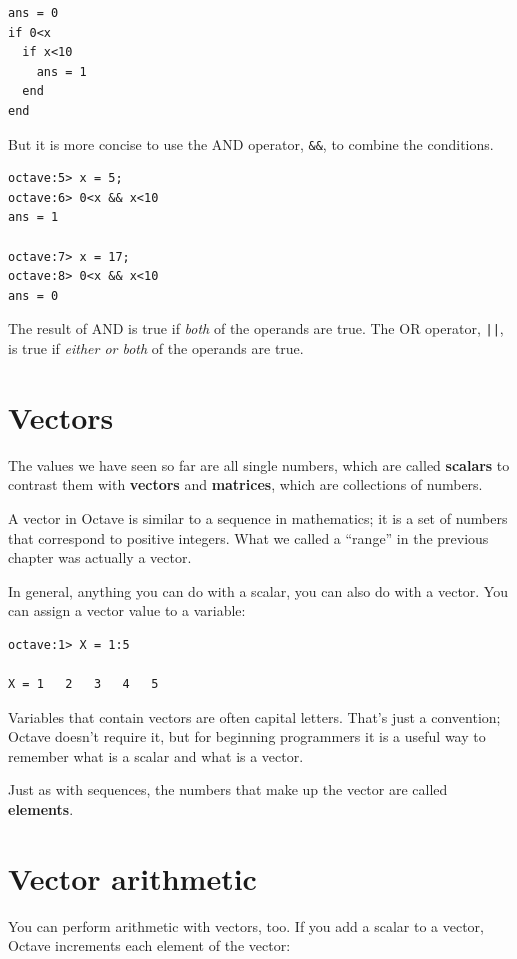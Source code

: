 \documentclass{book}
\begin{document}
\begin{verbatim}
ans = 0
if 0<x
  if x<10
    ans = 1
  end
end
\end{verbatim}

But it is more concise to use the AND operator, {\tt \&\&}, to
combine the conditions.

\begin{verbatim}
octave:5> x = 5;
octave:6> 0<x && x<10
ans = 1

octave:7> x = 17;
octave:8> 0<x && x<10
ans = 0
\end{verbatim}

The result of AND is true if {\em both} of the operands are
true. The OR operator, {\tt ||}, is true if {\em either or both}
of the operands are true.


\section{Vectors}

The values we have seen so far are all single numbers,
which are called {\bf scalars} to contrast them with {\bf vectors}
and {\bf matrices}, which are collections of numbers.

A vector in Octave is similar to a sequence in mathematics;
it is a set of numbers that correspond to positive integers. 
What
we called a ``range'' in the previous chapter was actually a
vector.

In general, anything you can do with a scalar, you can also do with
a vector. You can assign a vector value to a variable:

\begin{verbatim}
octave:1> X = 1:5

X = 1   2   3   4   5
\end{verbatim}

Variables that contain vectors are often capital letters. That's
just a convention; Octave doesn't require it, but for beginning
programmers it is a useful way to remember what is a scalar and
what is a vector.

Just as with sequences, the numbers that make up the vector are called
{\bf elements}.


\section{Vector arithmetic}

You can perform arithmetic with vectors, too. If you add a scalar
to a vector, Octave increments each element of the vector:
\end{document}

